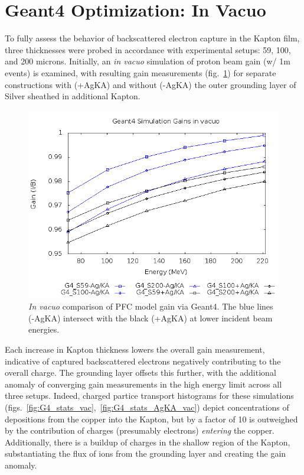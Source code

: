 \documentclass{article}
\begin{document}
\section{Geant4 Optimization: In Vacuo}

To fully assess the behavior of backscattered electron capture in the Kapton film, three thicknesses were probed in accordance with experimental setups: 59, 100, and 200 microns.  Initially, an \emph{in vacuo} simulation of proton beam gain (w/ 1m events) is examined, with resulting gain measurements (fig.~\ref{fig:G4_results_vac}) for separate constructions with (+AgKA) and without (-AgKA) the outer grounding layer of Silver sheathed in additional Kapton.

\begin{figure}[H]
  \centering
  \includegraphics[width=5in]{figures/fig_G4_results_vac.png}
  \caption{\emph{In vacuo} comparison of PFC model gain via Geant4.  The blue lines (-AgKA) intersect with the black (+AgKA) at lower incident beam energies.} 
  \label{fig:G4_results_vac}
\end{figure}

Each increase in Kapton thickness lowers the overall gain measurement, indicative of captured backscattered electrons negatively contributing to the overall charge.  The grounding layer offsets this further, with the additional anomaly of converging gain measurements in the high energy limit across all three setups.  Indeed, charged partice transport histograms for these simulations (figs.~\ref{fig:G4_stats_vac},~\ref{fig:G4_stats_AgKA_vac}) depict concentrations of depositions from the copper into the Kapton, but by a factor of 10 is outweighed by the contribution of charges (presumably electrons) \emph{entering} the copper.  Additionally, there is a buildup of charges in the shallow region of the Kapton, substantiating the flux of ions from the grounding layer and creating the gain anomaly.
\end{document}
